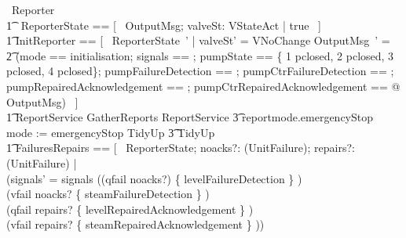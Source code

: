 \documentclass{report} %
\begin{document}
\begin{circus}
    \circprocess\ Reporter \circdef \circbegin \\
        \t1 \circstate\ ReporterState == [~ OutputMsg; valveSt: VStateAct | true ~] \\ %
        \t1 InitReporter == [~ ReporterState~' | valveSt' = VNoChange \land \theta OutputMsg~' = \\
            \t2 (\LET mode == initialisation; 
                signals == \emptyset[OutputSignal]; 
                pumpState == \{ 1 \mapsto pclosed, 2 \mapsto pclosed, 3 \mapsto pclosed, 4 \mapsto pclosed\}; 
                pumpFailureDetection == \emptyset[UnitFailure]; 
                pumpCtrFailureDetection == \emptyset[UnitFailure]; 
                pumpRepairedAcknowledgement == \emptyset[UnitFailure]; 
                pumpCtrRepairedAcknowledgement == \emptyset[UnitFailure]
                @ \theta OutputMsg) ~] \\ %
        \t1 ReportService \circdef GatherReports \circseq ReportService \extchoice  %
            \t3 reportmode.emergencyStop \then mode := emergencyStop \circseq TidyUp \extchoice %
            \t3 TidyUp \\
        \t1 FailuresRepairs == [~ \Delta ReporterState; noacks?: (\power UnitFailure); repairs?: (\power UnitFailure) | \\
                (signals' = signals \cup (\IF (qfail \in noacks?) \THEN \{ levelFailureDetection \} \ELSE \emptyset) \\
                \cup (\IF vfail \in noacks? \THEN \{ steamFailureDetection \} \ELSE \emptyset) \\
                \cup (\IF qfail \in repairs? \THEN \{ levelRepairedAcknowledgement \} \ELSE \emptyset) \\
                \cup (\IF vfail \in repairs? \THEN \{ steamRepairedAcknowledgement \} \ELSE \emptyset)) \land \\

\end{circus}
\end{document}
